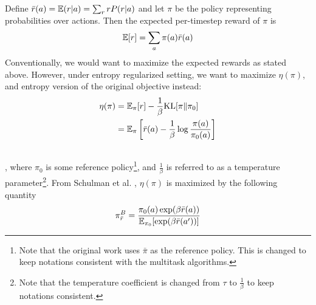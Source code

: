 \documentclass[12pt]{report}
\begin{document}
Define $\Bar{r}(a)=\mathbb{E}(r|a)=\sum_r rP(r|a)$ and let $\pi$ be the policy representing probabilities over actions. Then the expected per-timestep reward of $\pi$ is
$$\mathbb{E}[r]=\sum_a \pi(a)\Bar{r}(a)$$
Conventionally, we would want to maximize the expected rewards as stated above. However, under entropy regularized setting, we want to maximize $\eta(\pi)$, and entropy version of the original objective instead:
\begin{align}
    \eta(\pi)&=\mathbb{E}_\pi[r]-\frac{1}{\beta}\text{KL}[\pi\|\pi_0]\\
    &= \mathbb{E}_\pi\left[\Bar{r}(a) - \frac{1}{\beta}\log \frac{\pi(a)}{\pi_0(a)}\right]\\ 
    \nonumber
\end{align}
, where $\pi_0$ is some reference policy\footnote{Note that the original work \cite{schulman2017equivalence} uses $\bar{\pi}$ as the reference policy. This is changed to keep notations consistent with the multitask algorithms.}, and $\frac{1}{\beta}$ is referred to as a temperature parameter\footnote{Note that the temperature coefficient is changed from $\tau$ to $\frac{1}{\beta}$ to keep notations consistent.}. From Schulman et al. \cite{schulman2017equivalence}, $\eta(\pi)$ is maximized by the following quantity
\begin{align}
    \pi_{\Bar{r}}^B = \frac{\pi_0(a)\exp (\beta \Bar{r}(a))}{\mathbb{E}_{\pi_0}[\exp (\beta \Bar{r}(a^\prime))]} \label{eq2.3}
\end{align}




\end{document}
